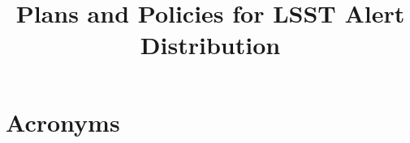\documentclass[DM,toc,lsstdraft]{lsstdoc}
\title{Plans and Policies for LSST Alert Distribution}
\begin{document}
\maketitle









\clearpage

\section{Acronyms}



\end{document}
